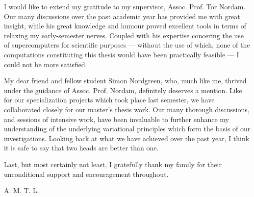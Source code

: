 I would like to extend my gratitude to my supervisor, Assoc. Prof. Tor Nordam.
Our many discussions over the past academic year has provided me with great
insight, while his great knowledge and humour proved excellent tools in terms
of relaxing my early-semester nerves. Coupled with his expertise concering the
use of supercomputers for scientific purposes --- without the use of which,
none of the computations constituting this thesis would have been practically
feasible --- I could not be more satisfied.

My dear friend and fellow student Simon Nordgreen, who, much like me, thrived
under the guidance of Assoc. Prof. Nordam, definitely deserves a mention. Like
for our specialization projects which took place last semester, we have
collaborated closely for our master's thesis work. Our many thorough
discussions, and sessions of intensive work, have been invaluable to further
enhance my understanding of the underlying variational principles which form
the basis of our investigations. Looking back at what we have achieved over the
past year, I think it is safe to say that two heads are better than one.


Last, but most certainly not least, I gratefully thank my family for their
unconditional support and encouragement throughout.

\begin{minipage}[t]{\textwidth}
\begin{flushright}
A. M. T. L.
\end{flushright}
\end{minipage}
